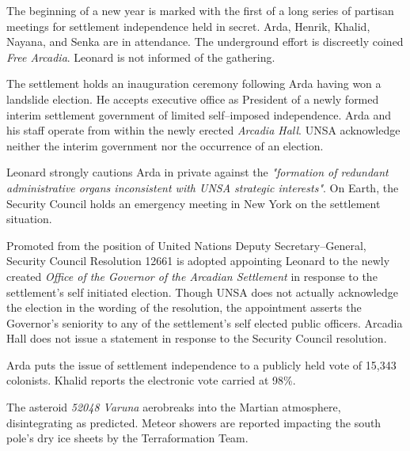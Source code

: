 

The beginning of a new year is marked with the first of a long series of partisan meetings for settlement independence held in secret. Arda, Henrik, Khalid, Nayana, and Senka are in attendance. The underground effort is discreetly coined {\it Free Arcadia}. Leonard is not informed of the gathering.
\StopTimelineDate

The settlement holds an inauguration ceremony following Arda having won a landslide election. He accepts executive office as President of a newly formed interim settlement government of limited self--imposed independence. Arda and his staff operate from within the newly erected {\it Arcadia Hall}. UNSA acknowledge neither the interim government nor the occurrence of an election.

Leonard strongly cautions Arda in private against the {\it "formation of redundant administrative organs inconsistent with UNSA strategic interests"}. On Earth, the Security Council holds an emergency meeting in New York on the settlement situation.
\StopTimelineDate

Promoted from the position of United Nations Deputy Secretary--General, Security Council Resolution 12661 is adopted appointing Leonard to the newly created {\it Office of the Governor of the Arcadian Settlement} in response to the settlement's self initiated election. Though UNSA does not actually acknowledge the election in the wording of the resolution, the appointment asserts the Governor's seniority to any of the settlement's self elected public officers. Arcadia Hall does not issue a statement in response to the Security Council resolution.
\StopTimelineDate

Arda puts the issue of settlement independence to a publicly held vote of 15,343 colonists. Khalid reports the electronic vote carried at 98\%.
\StopTimelineDate

The asteroid {\it 52048 Varuna} aerobreaks into the Martian atmosphere, disintegrating as predicted. Meteor showers are reported impacting the south pole's dry ice sheets by the Terraformation Team.
\StopTimelineDate

